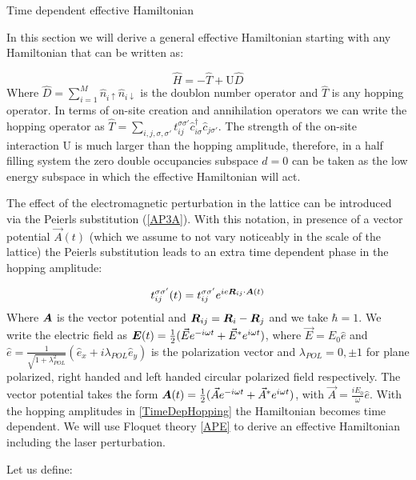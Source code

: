\begin{section}{Time dependent effective Hamiltonian}
\label{SectionTDHeff}

In this section we will derive a general effective Hamiltonian starting with any Hamiltonian that can be written as:

\begin{equation}
\hat{H} = -\hat{T} + \text{U}\hat{D}
\end{equation}
Where $\hat{D} = \sum_{i=1}^M \hat{n}_{i\uparrow}\hat{n}_{i\downarrow}$ is the doublon number operator and $\hat{T}$ is any hopping operator. In terms of on-site creation and annihilation operators we can write the hopping operator as $\hat{T} = \sum_{i,j, \sigma, \sigma'} t_{ij}^{\sigma \sigma'} \hat{c}_{i \sigma}^\dagger \hat{c}_{j \sigma'}$. The strength of the on-site interaction $\text{U}$ is much larger than the hopping amplitude, therefore, in a half filling system the zero double occupancies subspace $d=0$ can be taken as the low energy subspace in which the effective Hamiltonian will act.

The effect of the electromagnetic perturbation in the lattice can be introduced via the Peierls substitution (\ref{AP3A}). With this notation, in presence of a vector potential $\vec{A}(t)$ (which we assume to not vary noticeably in the scale of the lattice) the Peierls substitution leads to an extra time dependent phase in the hopping amplitude:

\begin{equation}
\label{TimeDepHopping}
t_{ij}^{\sigma \sigma'}(t) = t_{ij}^{\sigma \sigma'} e^{ie\boldsymbol{R}_{ij}\cdot\boldsymbol{A}(t)}
\end{equation}
Where $\boldsymbol{A}$ is the vector potential and $\boldsymbol{R}_{ij} = \boldsymbol{R}_i-\boldsymbol{R}_j$ and we take $\hbar=1$. We write the electric field as $\boldsymbol{E}(t) = \frac{1}{2}(\vec{E}e^{-i\omega t}+\vec{E}^*e^{i\omega t})$, where $\vec{E} = E_0\hat{e}$ and $\hat{e} = \frac{1}{\sqrt{1+\lambda_{POL}^2}}(\hat{e}_x+i\lambda_{POL}\hat{e}_y)$ is the polarization vector and $\lambda_{POL} = 0, \pm 1$ for plane polarized, right handed and left handed circular polarized field respectively. The vector potential takes the form $\boldsymbol{A}(t) = \frac{1}{2}(\vec{A}e^{-i\omega t} + \vec{A}^* e^{i\omega t})$, with $\vec{A} = \frac{iE_0}{\omega}\hat{e}$.
With the hopping amplitudes in \ref{TimeDepHopping} the Hamiltonian becomes time dependent. We will use Floquet theory \ref{APE} to derive an effective Hamiltonian including the laser perturbation.

Let us define:


\end{section}
